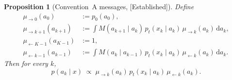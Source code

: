 \documentclass[11pt]{article}
\newtheorem{proposition}{Proposition}
\theoremstyle{definition}
\newcommand{\Established}{\textcolor{black!50!green}{\textsf{[Established]}}}
\begin{document}
\begin{proposition}[Convention~A messages,
\Established]\label{prop:convA}
Define
\begin{align}
    \mu_{\to 0}(a_0) &:= p_0(a_0), \label{eq:fwd-init}\\
    \mu_{\to k+1}(a_{k+1})
        &:= \int M(a_{k+1} \mid a_k)\, p_t(x_k \mid a_k)\,
                 \mu_{\to k}(a_k)\, \mathrm da_k, \label{eq:fwd-rec}\\
    \mu_{\leftarrow K-1}(a_{K-1}) &:= 1, \label{eq:bwd-init}\\
    \mu_{\leftarrow k - 1}(a_{k-1})
        &:= \int M(a_k \mid a_{k-1})\, p_t(x_k \mid a_k)\,
                 \mu_{\leftarrow k}(a_k)\, \mathrm da_k. \label{eq:bwd-rec}
\end{align}
Then for every \(k\),
\begin{equation}\label{eq:posterior-as-product}
    p(a_k \mid x) \;\propto\; \mu_{\to k}(a_k)\,
                              p_t(x_k \mid a_k)\,
                              \mu_{\leftarrow k}(a_k).
\end{equation}
\end{proposition}
\end{document}
